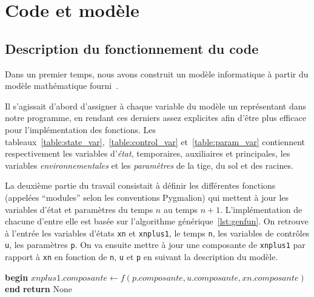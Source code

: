 \section{Code et modèle}

\newpage
\subsection{Description du fonctionnement du code}
Dans un premier temps, nous avons construit un modèle informatique à partir
du modèle mathématique fourni~\cite{lnas_model_wheat}.

Il s'agissait d'abord d'assigner à chaque variable du modèle un représentant
dans notre programme, en rendant ces derniers assez explicites
afin d'être plus efficace pour l'implémentation des fonctions.
Les tableaux~\ref{table:state_var},~\ref{table:control_var} et~\ref{table:param_var}
contiennent respectivement les variables d'\emph{état}, temporaires, auxiliaires et principales, 
les variables \emph{environnementales} et les \emph{paramètres} de la tige, du sol et des racines.

La deuxième partie du travail consistait à définir les différentes fonctions (appelées ``modules'' selon les conventions Pygmalion)
qui mettent à jour les variables d'état et paramètres du 
temps $n$ au temps $n+1$.
L'implémentation de chacune d'entre elle est basée sur l'algorithme générique~\ref{lst:genfun}.
On retrouve à l'entrée les variables d'états \texttt{xn} et \texttt{xnplus1},
le temps \texttt{n}, les variables de contrôles \texttt{u}, les paramètres \texttt{p}.
On va ensuite mettre à jour une composante de \lstinline|xnplus1| par rapport à \texttt{xn} en fonction de \texttt{n}, \texttt{u} et \texttt{p} en suivant la description du modèle.

\begin{algorithm}[h]
  \caption{Algorithme générique qui sert de base pour l'implémentation
des fonctions. La fonction $f$ n'est pas définie mais sert de placeholder
pour représenter les opérations nécessaires à la mise à jour de \lstinline|xnplus1|.}
\label{lst:genfun}
  \begin{algorithmic}[1]
    \State \textbf{begin}
      \State $xnplus1.composante \gets f(p.composante, u.composante, xn.composante)$
    \State \textbf{end}
    \State \textbf{return} None
    \EndProcedure
  \end{algorithmic}
\end{algorithm}

